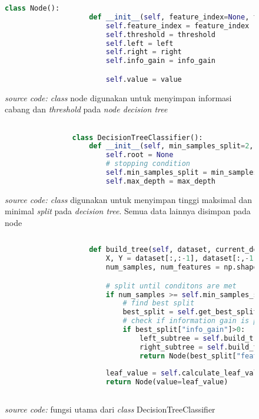 		\begin{figure}[H]
			\begin{lstlisting}[language=Python, basicstyle=\tiny]
				class Node():
					def __init__(self, feature_index=None, threshold=None, left=None, right=None, info_gain=None, value=None):
						self.feature_index = feature_index
						self.threshold = threshold
						self.left = left
						self.right = right
						self.info_gain = info_gain

						self.value = value
			\end{lstlisting}
			\caption{\emph{source code: class} node digunakan untuk menyimpan informasi cabang dan
			\textit{threshold} pada \emph{node decision tree}}
			\label{code: node class}
		\end{figure}	

		\begin{figure}[H]
			\begin{lstlisting}[language=Python, basicstyle=\tiny]

				class DecisionTreeClassifier():
					def __init__(self, min_samples_split=2, max_depth=2):
						self.root = None
						# stopping condition
						self.min_samples_split = min_samples_split
						self.max_depth = max_depth

			\end{lstlisting}
			\caption{\emph{source code: class} digunakan untuk menyimpan tinggi maksimal dan minimal 
			\textit{split} pada \emph{decision tree}. Semua data lainnya disimpan pada node}
			\label{code: DecisionTreeClassifier class}
		\end{figure}

		\begin{figure}[H]
			\begin{lstlisting}[language=Python, basicstyle=\tiny]
						
					def build_tree(self, dataset, current_depth = 0):
						X, Y = dataset[:,:-1], dataset[:,-1]
						num_samples, num_features = np.shape(X)

						# split until conditons are met
						if num_samples >= self.min_samples_split and current_depth <= self.max_depth:
							# find best split
							best_split = self.get_best_split(dataset, num_samples, num_features)
							# check if information gain is positive
							if best_split["info_gain"]>0:
								left_subtree = self.build_tree(best_split["dataset_left"], current_depth+1)
								right_subtree = self.build_tree(best_split["dataset_right"], current_depth+1)
								return Node(best_split["feature_index"], best_split["threshold"], left_subtree, right_subtree, best_split["info_gain"])
							
						leaf_value = self.calculate_leaf_value(Y)
						return Node(value=leaf_value)
					
			\end{lstlisting}
			\caption{\emph{source code:} fungsi utama dari \emph{class} DecisionTreeClassifier}
			\label{code: build tree function}
		\end{figure}

